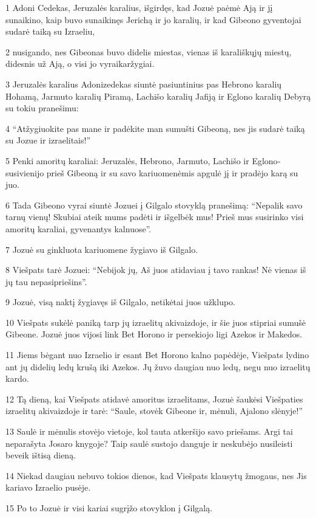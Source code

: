 \par 1 Adoni Cedekas, Jeruzalės karalius, išgirdęs, kad Jozuė paėmė Ają ir jį sunaikino, kaip buvo sunaikinęs Jerichą ir jo karalių, ir kad Gibeono gyventojai sudarė taiką su Izraeliu, 
\par 2 nusigando, nes Gibeonas buvo didelis miestas, vienas iš karališkųjų miestų, didesnis už Ają, o visi jo vyrai­karžygiai. 
\par 3 Jeruzalės karalius Adonizedekas siuntė pasiuntinius pas Hebrono karalių Hohamą, Jarmuto karalių Piramą, Lachišo karalių Jafiją ir Eglono karalių Debyrą su tokiu pranešimu: 
\par 4 “Atžygiuokite pas mane ir padėkite man sumušti Gibeoną, nes jis sudarė taiką su Jozue ir izraelitais!” 
\par 5 Penki amoritų karaliai: Jeruzalės, Hebrono, Jarmuto, Lachišo ir Eglono­susivienijo prieš Gibeoną ir su savo kariuomenėmis apgulė jį ir pradėjo karą su juo. 
\par 6 Tada Gibeono vyrai siuntė Jozuei į Gilgalo stovyklą pranešimą: “Nepalik savo tarnų vienų! Skubiai ateik mums padėti ir išgelbėk mus! Prieš mus susirinko visi amoritų karaliai, gyvenantys kalnuose”. 
\par 7 Jozuė su ginkluota kariuomene žygiavo iš Gilgalo. 
\par 8 Viešpats tarė Jozuei: “Nebijok jų, Aš juos atidaviau į tavo rankas! Nė vienas iš jų tau nepasipriešins”. 
\par 9 Jozuė, visą naktį žygiavęs iš Gilgalo, netikėtai juos užklupo. 
\par 10 Viešpats sukėlė paniką tarp jų izraelitų akivaizdoje, ir šie juos stipriai sumušė Gibeone. Jozuė juos vijosi link Bet Horono ir persekiojo ligi Azekos ir Makedos. 
\par 11 Jiems bėgant nuo Izraelio ir esant Bet Horono kalno papėdėje, Viešpats lydino ant jų didelių ledų krušą iki Azekos. Jų žuvo daugiau nuo ledų, negu nuo izraelitų kardo. 
\par 12 Tą dieną, kai Viešpats atidavė amoritus izraelitams, Jozuė šaukėsi Viešpaties izraelitų akivaizdoje ir tarė: “Saule, stovėk Gibeone ir, mėnuli, Ajalono slėnyje!” 
\par 13 Saulė ir mėnulis stovėjo vietoje, kol tauta atkeršijo savo priešams. Argi tai neparašyta Josaro knygoje? Taip saulė sustojo danguje ir neskubėjo nusileisti beveik ištisą dieną. 
\par 14 Niekad daugiau nebuvo tokios dienos, kad Viešpats klausytų žmogaus, nes Jis kariavo Izraelio pusėje. 
\par 15 Po to Jozuė ir visi kariai sugrįžo stovyklon į Gilgalą. 
